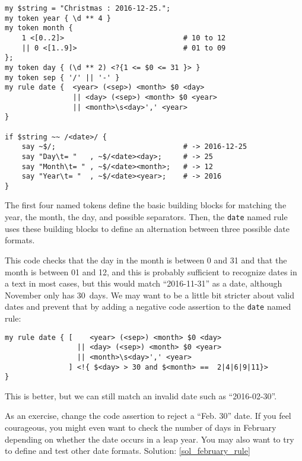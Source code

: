 \begin{verbatim}
my $string = "Christmas : 2016-12-25.";                                         
my token year { \d ** 4 }                                        
my token month {   
    1 <[0..2]>                            # 10 to 12                     
    || 0 <[1..9]>                         # 01 to 09                     
};
my token day { (\d ** 2) <?{1 <= $0 <= 31 }> }  
my token sep { '/' || '-' } 
my rule date {  <year> (<sep>) <month> $0 <day> 
                || <day> (<sep>) <month> $0 <year> 
                || <month>\s<day>',' <year>
}                         

if $string ~~ /<date>/ {
    say ~$/;                              # -> 2016-12-25
    say "Day\t= "   , ~$/<date><day>;     # -> 25
    say "Month\t= " , ~$/<date><month>;   # -> 12
    say "Year\t= "  , ~$/<date><year>;    # -> 2016
}          
\end{verbatim} 

The first four named tokens define the basic building 
blocks for matching the year, the month, the day, and 
possible separators. Then, the {\tt date}  
named rule uses these building blocks to define an 
alternation between three possible date formats.

This code checks that the day in the month is between 0 and 31 
and that the month is between 01 and 12, and this is 
probably sufficient to recognize dates in a 
text in most cases, but this would match ``2016-11-31'' 
as a date, although November only has 30~days. We may want 
to be a little bit stricter about valid dates and prevent 
that by adding a negative code assertion to the {\tt date} 
named rule:

\begin{verbatim}
my rule date { [    <year> (<sep>) <month> $0 <day> 
                 || <day> (<sep>) <month> $0 <year> 
                 || <month>\s<day>',' <year>
               ] <!{ $<day> > 30 and $<month> ==  2|4|6|9|11}>
}                         
\end{verbatim}


This is better, but we can still match an invalid date 
such as ``2016-02-30''. 

\begin{exercise}
\label{february_rule}
%
As an exercise, change the code 
assertion to reject a ``Feb. 30'' date. If you feel 
courageous, you might even want to check the number of 
days in February depending on whether the date occurs in 
a leap year. You may also want to try to define and test 
other date formats. Solution: \ref{sol_february_rule}
\end{exercise}

